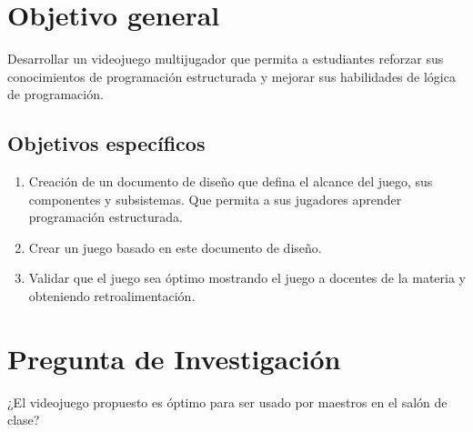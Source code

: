 \section{Objetivo general}
Desarrollar un videojuego multijugador que permita a estudiantes reforzar sus conocimientos de programación estructurada y mejorar sus habilidades de lógica de programación. 

\subsection{Objetivos específicos}

\begin{enumerate}
    \item Creación de un documento de diseño que defina el alcance del juego, sus componentes y subsistemas. Que permita a sus jugadores aprender programación estructurada.
    \item Crear un juego basado en este documento de diseño.
    \item Validar que el juego sea óptimo mostrando el juego a docentes de la materia y obteniendo retroalimentación.
\end{enumerate}

\section{Pregunta de Investigación}
¿El videojuego propuesto es óptimo para ser usado por maestros en el salón de clase?

